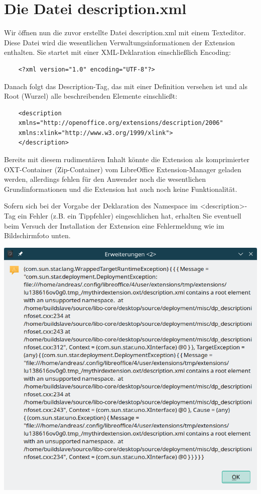 \documentclass[12pt,a4paper,titlepage]{book}
\begin{document}
\section{Die Datei description.xml}\label{description_xml}
Wir öffnen nun die zuvor erstellte Datei description.xml mit einem Texteditor. Diese Datei wird die wesentlichen Verwaltungsinformationen der Extension enthalten.
Sie startet mit einer XML-Deklaration einschließlich Encoding:
\begin{lstlisting}
	<?xml version="1.0" encoding="UTF-8"?>
\end{lstlisting}
Danach folgt das Description-Tag, das mit einer Definition versehen ist und als Root (Wurzel) alle beschreibenden Elemente einschließt:
\begin{lstlisting}
	<description
	xmlns="http://openoffice.org/extensions/description/2006"
	xmlns:xlink="http://www.w3.org/1999/xlink">
	</description>
\end{lstlisting}
Bereits mit diesem rudimentären Inhalt könnte die Extension als komprimierter OXT-Container (Zip-Container) vom LibreOffice Extension-Manager geladen werden, allerdings fehlen für den Anwender noch die wesentlichen Grundinformationen und die Extension hat auch noch keine Funktionalität.

Sofern sich bei der Vorgabe der Deklaration des Namespace im <description>-Tag ein Fehler (z.B. ein Tippfehler) eingeschlichen hat, erhalten Sie eventuell beim Versuch der Installation der Extension eine Fehlermeldung wie im Bildschirmfoto unten.
\begin{center}
	\captionsetup{type=figure}
	\includegraphics[width=0.7\linewidth]{pics/libo24_2_error_wrong_namedeclaration}
	\label{fig:error_wrong_namedeclaration}
\end{center}
\end{document}
